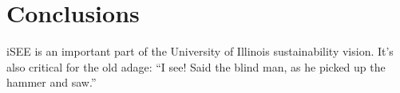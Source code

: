 \section{Conclusions}

iSEE is an important part of the University of Illinois sustainability vision.
It's also critical for the old adage: ``I see! Said the blind man, as he picked
up the hammer and saw.'' \cite{isee_illinois_2015}
